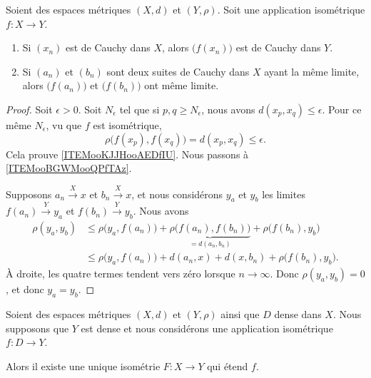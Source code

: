 \begin{lemma}     \label{LEMooGJONooVwUgyv}
	Soient des espaces métriques \( (X,d)\) et \( (Y,\rho)\). Soit une application isométrique \( f\colon X\to Y\).
	\begin{enumerate}
		\item       \label{ITEMooKJJHooAEDfIU}
		      Si \( (x_n)\) est de Cauchy dans \( X\), alors \( \big( f(x_n) \big)\) est de Cauchy dans \( Y\).
		\item       \label{ITEMooBGWMooQPfTAz}

		      Si \( (a_n)\) et \( (b_n)\) sont deux suites de Cauchy dans \( X\) ayant la même limite, alors \( \big( f(a_n) \big)\) et \( \big( f(b_n) \big)\) ont même limite.
	\end{enumerate}
\end{lemma}

\begin{proof}
	Soit \( \epsilon>0\). Soit \( N_{\epsilon}\) tel que si \( p,q\geq N_{\epsilon}\), nous avons \( d(x_p,x_q)\leq \epsilon\). Pour ce même \( N_{\epsilon}\), vu que \( f\) est isométrique,
	\begin{equation}
		\rho\big( f(x_p),f(x_q) \big) = d(x_p,x_q)\leq \epsilon.
	\end{equation}
	Cela prouve \ref{ITEMooKJJHooAEDfIU}. Nous passons à \ref{ITEMooBGWMooQPfTAz}.

	Supposons \( a_n\stackrel{X}{\longrightarrow}x\) et \( b_n\stackrel{X}{\longrightarrow}x\), et nous considérons \( y_a\) et \( y_b\) les limites \( f(a_n)\stackrel{Y}{\longrightarrow}y_a\) et \( f(b_n)\stackrel{Y}{\longrightarrow}y_b\). Nous avons
	\begin{subequations}
		\begin{align}
			\rho(y_a,y_b) & \leq \rho\big( y_a,f(a_n) \big)+\underbrace{\rho\big( f(a_n),f(b_n) \big)}_{=d(a_n,b_n)}+\rho\big( f(b_n),y_b \big) \\
			              & \leq \rho\big( y_a,f(a_n) \big)+d(a_n,x)+d(x,b_n)+\rho\big( f(b_n),y_b \big).
		\end{align}
	\end{subequations}
	À droite, les quatre termes tendent vers zéro lorsque \( n\to \infty\). Donc \( \rho(y_a,y_b)=0\), et donc \( y_a=y_b\).
\end{proof}


\begin{lemma}     \label{LEMooNFIOooZUMhuA}
	Soient des espaces métriques \( (X,d)\) et \( (Y,\rho)\) ainsi que \( D\) dense dans \( X\). Nous supposons que \( Y\) est dense et nous considérons une application isométrique \( f\colon D\to Y\).

	Alors il existe une unique isométrie \( F\colon X\to Y\) qui étend \( f\).
\end{lemma}

